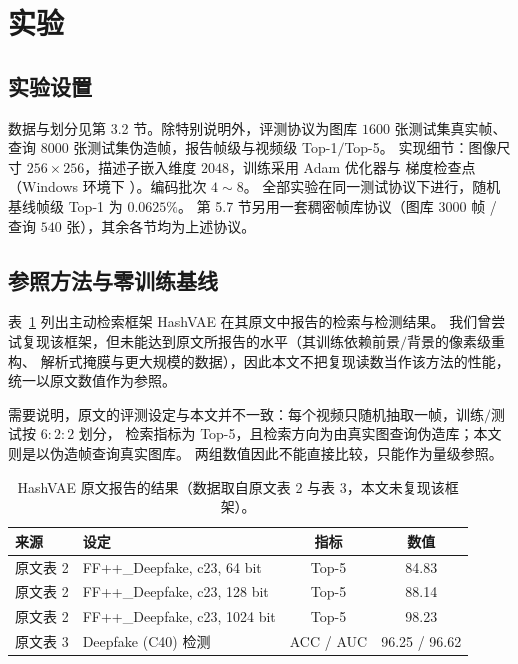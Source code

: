 \section{实验}
\label{sec:exp}

\subsection{实验设置}

数据与划分见第 3.2 节。除特别说明外，评测协议为图库 $1600$ 张测试集真实帧、
查询 $8000$ 张测试集伪造帧，报告帧级与视频级 Top-1$/$Top-5。
实现细节：图像尺寸 $256\times256$，描述子嵌入维度 $2048$，训练采用 Adam 优化器与
梯度检查点（Windows 环境下 ）。编码批次 $4\sim8$。
全部实验在同一测试协议下进行，随机基线帧级 Top-1 为 $0.0625\%$。
第 5.7 节另用一套稠密帧库协议（图库 $3000$ 帧 / 查询 $540$ 张），其余各节均为上述协议。

\subsection{参照方法与零训练基线}
\label{sec:baseline}

表~\ref{tab:hashvae} 列出主动检索框架 HashVAE 在其原文中报告的检索与检测结果。
我们曾尝试复现该框架，但未能达到原文所报告的水平（其训练依赖前景$/$背景的像素级重构、
解析式掩膜与更大规模的数据），因此本文不把复现读数当作该方法的性能，
统一以原文数值作为参照。

需要说明，原文的评测设定与本文并不一致：每个视频只随机抽取一帧，训练$/$测试按 $6{:}2{:}2$ 划分，
检索指标为 Top-5，且检索方向为由真实图查询伪造库；本文则是以伪造帧查询真实图库。
两组数值因此不能直接比较，只能作为量级参照。

\begin{table}[t]
\centering
\caption{HashVAE 原文报告的结果（数据取自原文表 2 与表 3，本文未复现该框架）。}
\label{tab:hashvae}
\small
\begin{tabular}{llcc}
\toprule
来源 & 设定 & 指标 & 数值 \\
\midrule
原文表 2 & FF++\_Deepfake, c23, 64 bit  & Top-5 & 84.83 \\
原文表 2 & FF++\_Deepfake, c23, 128 bit & Top-5 & 88.14 \\
原文表 2 & FF++\_Deepfake, c23, 1024 bit & Top-5 & 98.23 \\
原文表 3 & Deepfake (C40) 检测 & ACC / AUC & 96.25 / 96.62 \\
\bottomrule
\end{tabular}
\end{table}

